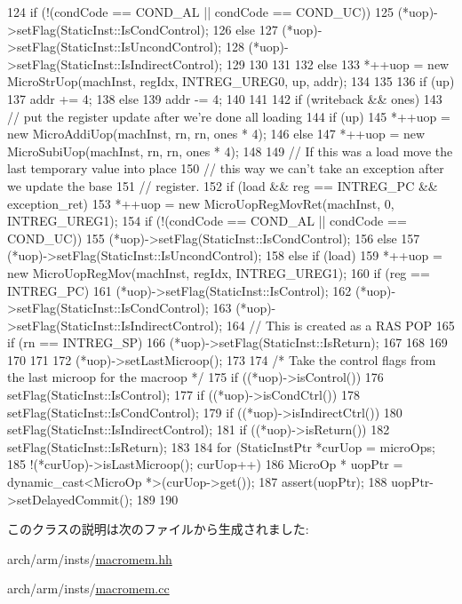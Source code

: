 \begin{DoxyCode}
{{{{{{124                         if (!(condCode == COND_AL || condCode == COND_UC))
125                             (*uop)->setFlag(StaticInst::IsCondControl);
126                         else
127                             (*uop)->setFlag(StaticInst::IsUncondControl);
128                         (*uop)->setFlag(StaticInst::IsIndirectControl);
129                     }
130                 }
131             }
132         } else {
133             *++uop = new MicroStrUop(machInst, regIdx, INTREG_UREG0, up, addr);
134         }
135 
136         if (up)
137             addr += 4;
138         else
139             addr -= 4;
140     }
141 
142     if (writeback && ones) {
143         // put the register update after we're done all loading
144         if (up)
145             *++uop = new MicroAddiUop(machInst, rn, rn, ones * 4);
146         else
147             *++uop = new MicroSubiUop(machInst, rn, rn, ones * 4);
148 
149         // If this was a load move the last temporary value into place
150         // this way we can't take an exception after we update the base
151         // register.
152         if (load && reg == INTREG_PC && exception_ret) {
153             *++uop = new MicroUopRegMovRet(machInst, 0, INTREG_UREG1);
154             if (!(condCode == COND_AL || condCode == COND_UC))
155                 (*uop)->setFlag(StaticInst::IsCondControl);
156             else
157                 (*uop)->setFlag(StaticInst::IsUncondControl);
158         } else if (load) {
159             *++uop = new MicroUopRegMov(machInst, regIdx, INTREG_UREG1);
160             if (reg == INTREG_PC) {
161                 (*uop)->setFlag(StaticInst::IsControl);
162                 (*uop)->setFlag(StaticInst::IsCondControl);
163                 (*uop)->setFlag(StaticInst::IsIndirectControl);
164                 // This is created as a RAS POP
165                 if (rn == INTREG_SP)
166                     (*uop)->setFlag(StaticInst::IsReturn);
167 
168             }
169         }
170     }
171 
172     (*uop)->setLastMicroop();
173 
174     /* Take the control flags from the last microop for the macroop */
175     if ((*uop)->isControl())
176         setFlag(StaticInst::IsControl);
177     if ((*uop)->isCondCtrl())
178         setFlag(StaticInst::IsCondControl);
179     if ((*uop)->isIndirectCtrl())
180         setFlag(StaticInst::IsIndirectControl);
181     if ((*uop)->isReturn())
182         setFlag(StaticInst::IsReturn);
183 
184     for (StaticInstPtr *curUop = microOps;
185             !(*curUop)->isLastMicroop(); curUop++) {
186         MicroOp * uopPtr = dynamic_cast<MicroOp *>(curUop->get());
187         assert(uopPtr);
188         uopPtr->setDelayedCommit();
189     }
190 }

\end{DoxyCode}


このクラスの説明は次のファイルから生成されました:\begin{DoxyCompactItemize}
\item 
arch/arm/insts/\hyperlink{macromem_8hh}{macromem.hh}\item 
arch/arm/insts/\hyperlink{macromem_8cc}{macromem.cc}\end{DoxyCompactItemize}
